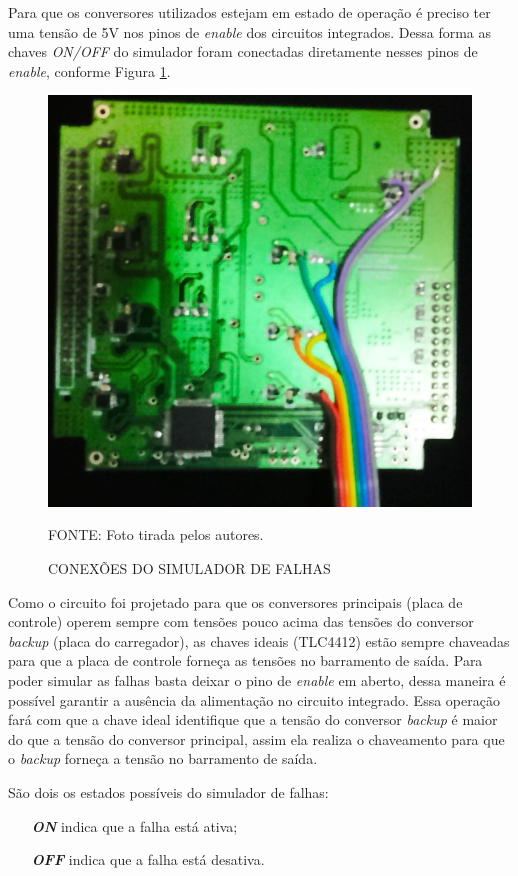 \documentclass[
	12pt,				%
	openright,			%
	oneside,			%
	a4paper,			%
	english,			%
	french,				%
	spanish,			%
	brazil,				%
	oldfontcommands
	]{abntex2}
\begin{document}
	Para que os conversores utilizados estejam em estado de operação é preciso ter uma tensão de 5V nos pinos de \textit{enable} dos circuitos integrados. Dessa forma as chaves \textit{ON/OFF} do simulador foram conectadas diretamente nesses pinos de \textit{enable}, conforme Figura \ref{Fig_Simulador_Enable}.
		
	\begin{figure}[th]
		\caption{CONEXÕES DO SIMULADOR DE FALHAS}
		\label{Fig_Simulador_Enable}
		\centering
		\includegraphics[width=0.5\linewidth]{./figs/simulador_conexao}
			
		\begin{small}
			FONTE: Foto tirada pelos autores.
		\end{small}		
	\end{figure}
	
	Como o circuito foi projetado para que os conversores principais (placa de controle) operem sempre com tensões pouco acima das tensões do conversor \textit{backup} (placa do carregador), as chaves ideais (TLC4412) estão sempre chaveadas para que a placa de controle forneça as tensões no barramento de saída. Para poder simular as falhas basta deixar o pino de \textit{enable} em aberto, dessa maneira é possível garantir a ausência da alimentação no circuito integrado. Essa operação fará com que a chave ideal identifique que a tensão do conversor \textit{backup} é maior do que a tensão do conversor principal, assim ela realiza o chaveamento para que o \textit{backup} forneça a tensão no barramento de saída.
	
	São dois os estados possíveis do simulador de falhas:
	
	\begin{itemize}
		\item[\textbf{\textit{ON}}] indica que a falha está ativa;
		\item[\textbf{\textit{OFF}}] indica que a falha está desativa. 
	\end{itemize}
	
\end{document}
